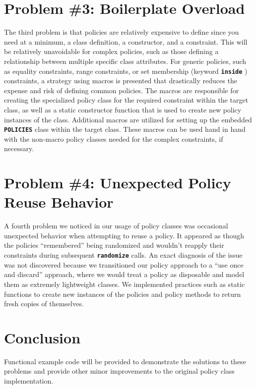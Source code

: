 \documentclass[conference,onecolumn]{IEEEtran}
\newcommand{\code}[1]{
\textbf{\texttt{#1}}
}
\begin{document}
\section{Problem \#3: Boilerplate Overload}

The third problem is that policies are relatively expensive to define since you need at a minimum, a class definition, a constructor, and a constraint. This will be relatively unavoidable for complex policies, such as those defining a relationship between multiple specific class attributes. For generic policies, such as equality constraints, range constraints, or set membership (keyword \code{inside}) constraints, a strategy using macros is presented that drastically reduces the expense and risk of defining common policies. The macros are responsible for creating the specialized policy class for the required constraint within the target class, as well as a static constructor function that is used to create new policy instances of the class. Additional macros are utilized for setting up the embedded \code{POLICIES} class within the target class. These macros can be used hand in hand with the non-macro policy classes needed for the complex constraints, if necessary.

\section{Problem \#4: Unexpected Policy Reuse Behavior}

A fourth problem we noticed in our usage of policy classes was occasional unexpected behavior when attempting to reuse a policy. It appeared as though the policies ``remembered'' being randomized and wouldn't reapply their constraints during subsequent \code{randomize} calls. An exact diagnosis of the issue was not discovered because we transitioned our policy approach to a ``use once and discard'' approach, where we would treat a policy as disposable and model them as extremely lightweight classes. We implemented practices such as static functions to create new instances of the policies and policy methods to return fresh copies of themselves.

\section{Conclusion}

Functional example code will be provided to demonstrate the solutions to these problems and provide other minor improvements to the original policy class implementation.
\end{document}
